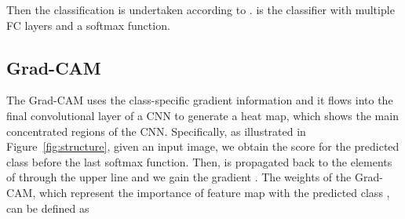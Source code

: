 \documentclass{article}
\begin{document}
Then the classification is undertaken according to .  is the classifier with multiple FC layers and a softmax function.

\vspace{-2mm}
\subsection{Grad-CAM}

The Grad-CAM uses the class-specific gradient information and it flows into the final convolutional layer of a CNN to generate a heat map, which shows the main concentrated regions of the CNN. Specifically, as illustrated in Figure~\ref{fig:structure}, given an input image, we obtain the score  for the predicted class  before the last softmax function. Then,  is propagated back to the elements of  through the upper line and we gain the gradient . The weights  of the Grad-CAM, which represent the importance of feature map  with the predicted class , can be defined as
\end{document}
